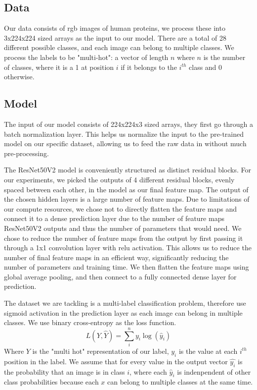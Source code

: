 \documentclass{article}
\begin{document}
\subsection{Data}
Our data consists of rgb images of human proteins, we process these into 3x224x224 sized
arrays as the input to our model. There are a total of 28 different possible classes,
and each image can belong to multiple classes. We process the labels to be "multi-hot":
a vector of length $n$ where $n$ is the number of classes, where it is a 1 at position $i$ if it belongs to the $i^{th}$ class and 0 otherwise.
\subsection{Model}

The input of our model consists of 224x224x3 sized arrays, they first go through a batch normalization layer\cite{ioffe2015batch}. This helps
us normalize the input to the pre-trained model on our specific dataset, allowing us 
to feed the raw data in without much pre-processing.

The ResNet50V2 model is conveniently structured as distinct residual blocks.
For our experiments, we picked the outputs of 4 different residual blocks, evenly spaced between each other, in the model
as our final feature map. The output of the chosen hidden layers is a large number of feature maps. Due to limitations of our compute resources, we chose not to directly flatten the feature maps and connect it to a dense prediction
layer due to the number of feature maps ResNet50V2 outputs and thus the number of parameters that would need. We chose to reduce the number of feature maps from the output by first passing it through a 1x1 convolution layer\cite{szegedy2014going} with 
relu activation. This allows us to reduce the number of final feature maps in an efficient way, significantly reducing the number of parameters and training time. 
We then flatten the feature maps using global average pooling\cite{Lin2013NetworkIN}, and then connect to a 
fully connected dense layer for prediction. 

The dataset we are tackling is a multi-label classification problem, therefore use sigmoid activation
in the prediction layer as each image can belong in multiple classes. We use binary cross-entropy as the loss function. 
\begin{equation}
    L(Y, \hat{Y}) = \sum_i^n y_i\log{(\hat{y}_i)}
\end{equation}
Where $Y$ is the "multi hot" representation of our label, $y_i$
is the value at each $i^{th}$ position in the label.  We assume that for every value in the output vector $\hat{y_i}$ is the probability
that an image is in class $i$, where each $\hat{y}_i$ is indenpendent of other class probabilities because 
each $x$ can belong to multiple classes at the same time. 
\end{document}
